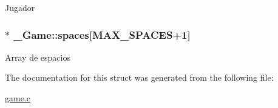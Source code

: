 Jugador \hypertarget{struct__Game_ab4180417d9148f8abb2233ca6c4ecfe5}{
\subsubsection[{spaces}]{$\ast$ \+\_\+\+Game\+::spaces\mbox{[}{\bf M\+A\+X\+\_\+\+S\+P\+A\+C\+E\+S}+1\mbox{]}}}\label{struct__Game_ab4180417d9148f8abb2233ca6c4ecfe5}
Array de espacios 

The documentation for this struct was generated from the following file\+:\begin{DoxyCompactItemize}
\item 
\hyperlink{game_8c}{game.\+c}\end{DoxyCompactItemize}
